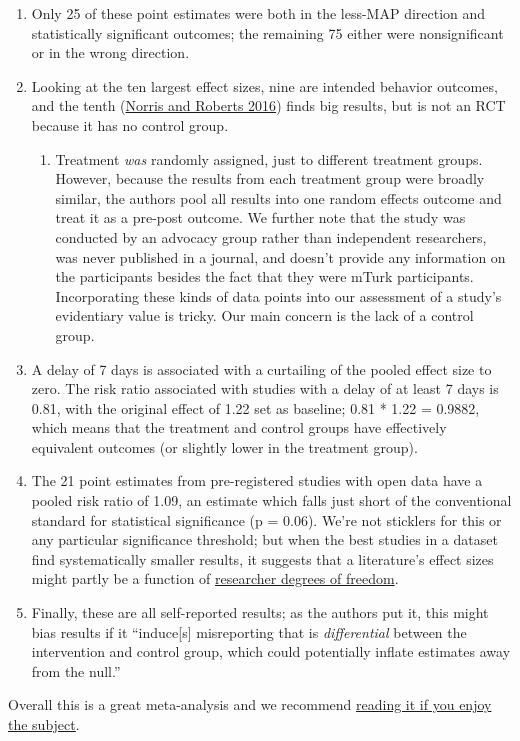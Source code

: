 \documentclass[
  letterpaper,
  DIV=11,
  numbers=noendperiod]{scrartcl}
\providecommand{\tightlist}{%
  \setlength{\itemsep}{0pt}\setlength{\parskip}{0pt}}\usepackage{longtable,booktabs,array}
\begin{document}
\begin{enumerate}
\def\labelenumi{\arabic{enumi}.}
\tightlist
\item
  Only 25 of these point estimates were both in the less-MAP direction
  and statistically significant outcomes; the remaining 75 either were
  nonsignificant or in the wrong direction.
\item
  Looking at the ten largest effect sizes, nine are intended behavior
  outcomes, and the tenth
  (\href{https://veganoutreach.org/ppr-2016/}{Norris and Roberts 2016})
  finds big results, but is not an RCT because it has no control group.

  \begin{enumerate}
  \def\labelenumii{\arabic{enumii}.}
  \tightlist
  \item
    Treatment \emph{was} randomly assigned, just to different treatment
    groups. However, because the results from each treatment group were
    broadly similar, the authors pool all results into one random
    effects outcome and treat it as a pre-post outcome. We further note
    that the study was conducted by an advocacy group rather than
    independent researchers, was never published in a journal, and
    doesn't provide any information on the participants besides the fact
    that they were mTurk participants. Incorporating these kinds of data
    points into our assessment of a study's evidentiary value is tricky.
    Our main concern is the lack of a control group.
  \end{enumerate}
\item
  A delay of 7 days is associated with a curtailing of the pooled effect
  size to zero. The risk ratio associated with studies with a delay of
  at least 7 days is 0.81, with the original effect of 1.22 set as
  baseline; 0.81 * 1.22 = 0.9882, which means that the treatment and
  control groups have effectively equivalent outcomes (or slightly lower
  in the treatment group).
\item
  The 21 point estimates from pre-registered studies with open data have
  a pooled risk ratio of 1.09, an estimate which falls just short of the
  conventional standard for statistical significance (p = 0.06). We're
  not sticklers for this or any particular significance threshold; but
  when the best studies in a dataset find systematically smaller
  results, it suggests that a literature's effect sizes might partly be
  a function of
  \href{https://www.frontiersin.org/articles/10.3389/fpsyg.2016.01832/full}{researcher
  degrees of freedom}.
\item
  Finally, these are all self-reported results; as the authors put it,
  this might bias results if it ``induce{[}s{]} misreporting that is
  \emph{differential} between the intervention and control group, which
  could potentially inflate estimates away from the null.''
\end{enumerate}

Overall this is a great meta-analysis and we recommend
\href{https://www.sciencedirect.com/science/article/pii/S0195666321001847}{reading
it if you enjoy the subject}.
\end{document}
